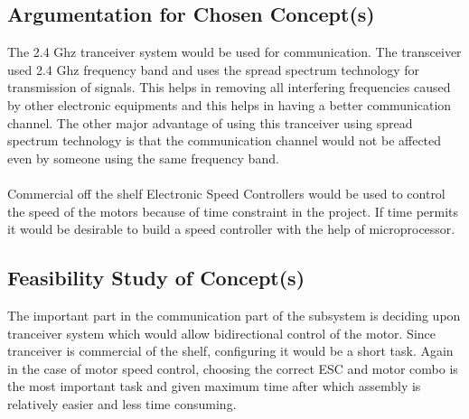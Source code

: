 \subsection{Argumentation for Chosen Concept(s)}

The 2.4 Ghz tranceiver system would be used for communication. The transceiver used 2.4 Ghz frequency band and uses the spread spectrum technology for transmission of signals. This helps in removing all interfering frequencies caused by other electronic equipments and this helps in having a better communication channel. The other major advantage of using this tranceiver using spread spectrum technology is that the communication channel would not be affected even by someone using the same frequency band.
\\
\\
Commercial off the shelf Electronic Speed Controllers would be used to control the speed of the motors because of time constraint in the project. If time permits it would be desirable to build a speed controller with the help of microprocessor.

\subsection{Feasibility Study of Concept(s)}

The important part in the communication part of the subsystem is deciding upon tranceiver system which would allow bidirectional control of the motor. Since tranceiver is commercial of the shelf, configuring it would be a short task.
Again in the case of motor speed control, choosing the correct ESC and motor combo is the most important task and given maximum time after which assembly is relatively easier and less time consuming.

%
%
%

